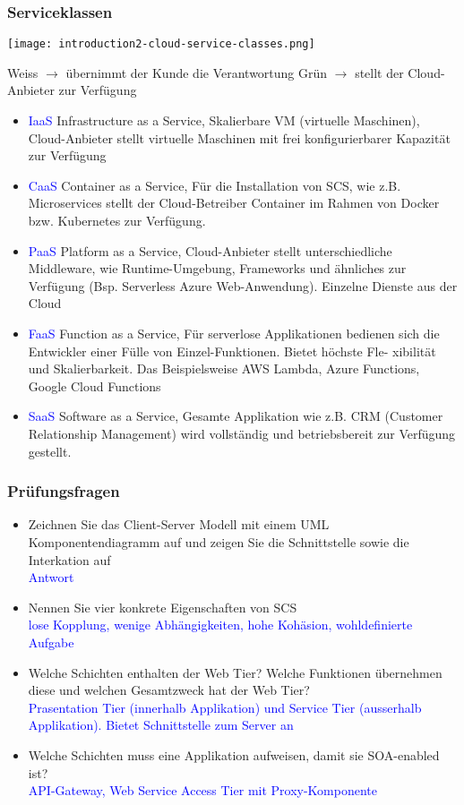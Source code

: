 \subsubsection{Serviceklassen}

\texttt{[image: introduction2-cloud-service-classes.png]}

Weiss $\rightarrow$ übernimmt der Kunde die Verantwortung
Grün $\rightarrow$ stellt der Cloud-Anbieter zur Verfügung

\begin{itemize}
    \item \textcolor{blue}{IaaS} Infrastructure as a Service, Skalierbare VM (virtuelle Maschinen), Cloud-Anbieter stellt virtuelle Maschinen mit frei konfigurierbarer Kapazität zur Verfügung
    \item \textcolor{blue}{CaaS} Container as a Service, Für die Installation von SCS, wie z.B. Microservices stellt der Cloud-Betreiber Container im Rahmen von Docker bzw. Kubernetes zur Verfügung.
    \item \textcolor{blue}{PaaS} Platform as a Service, Cloud-Anbieter stellt unterschiedliche Middleware, wie Runtime-Umgebung, Frameworks und ähnliches zur Verfügung (Bsp. Serverless Azure Web-Anwendung). Einzelne Dienste aus der Cloud
    \item \textcolor{blue}{FaaS} Function as a Service, Für serverlose Applikationen bedienen sich die Entwickler einer Fülle von Einzel-Funktionen. Bietet höchste Fle-
    xibilität und Skalierbarkeit. Das Beispielsweise AWS Lambda, Azure Functions, Google Cloud Functions
    \item \textcolor{blue}{SaaS} Software as a Service, Gesamte Applikation wie z.B. CRM (Customer Relationship Management) wird vollständig und betriebsbereit zur Verfügung gestellt.
\end{itemize}

\subsubsection{Prüfungsfragen}

\begin{itemize}
    \item Zeichnen Sie das Client-Server Modell mit einem UML Komponentendiagramm auf und zeigen Sie die Schnittstelle sowie die Interkation auf \\
    \textcolor{blue}{Antwort}
    \item Nennen Sie vier konkrete Eigenschaften von SCS \\
    \textcolor{blue}{lose Kopplung, wenige Abhängigkeiten, hohe Kohäsion, wohldefinierte Aufgabe}
    \item Welche Schichten enthalten der Web Tier? Welche Funktionen übernehmen diese und welchen Gesamtzweck hat der Web Tier? \\
    \textcolor{blue}{Prasentation Tier (innerhalb Applikation) und Service Tier (ausserhalb Applikation). Bietet Schnittstelle zum Server an}
    \item Welche Schichten muss eine Applikation aufweisen, damit sie SOA-enabled ist? \\
    \textcolor{blue}{API-Gateway, Web Service Access Tier mit Proxy-Komponente}
\end{itemize}
